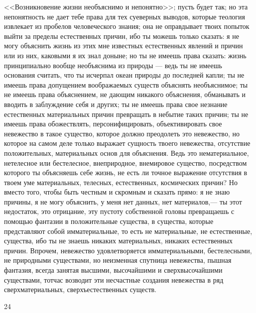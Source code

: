 \documentclass[12pt]{article}
\begin{document}
<<Возникновение жизни необъяснимо и непонятно>>; пусть будет так; но эта непонятность не дает тебе права для тех суеверных выводов, которые теология извлекает из пробелов человеческого знания; она не оправдывает твоих попыток выйти за пределы естественных причин, ибо ты можешь только сказать: я не могу объяснить жизнь из этих мне известных естественных явлений и причин или из них, каковыми я их знал доныне; но ты не имеешь права сказать: жизнь принципиально вообще необъяснима из природы --- ведь ты не имеешь основания считать, что ты исчерпал океан природы до последней капли; ты не имеешь права допущением воображаемых существ объяснять необъяснимое; ты не имеешь права объяснением, не дающим никакого объяснения, обманывать и вводить в заблуждение себя и других; ты не имеешь права свое незнание естественных материальных причин превращать в небытие таких причин; ты не имеешь права обожествлять, персонифицировать, объективировать свое невежество в такое существо, которое должно преодолеть это невежество, но которое на самом деле только выражает сущность твоего невежества, отсутствие положительных, материальных основ для объяснения. Ведь это нематериальное, нетелесное или бестелесное, внеприродное, внемировое существо, посредством которого ты объясняешь себе жизнь, не есть ли точное выражение отсутствия в твоем уме материальных, телесных, естественных, космических причин? Но вместо того, чтобы быть честным и скромным и сказать прямо: я не знаю причины, я не могу объяснить, у меня нет данных, нет материалов,--- ты этот недостаток, это отрицание, эту пустоту собственной головы превращаешь с помощью фантазии в положительные существа, в существа, которые представляют собой имматериальные, то есть не материальные, не естественные, существа, ибо ты не знаешь никаких материальных, никаких естественных причин. Впрочем, невежество удовлетворяется имматериальными, бестелесными, не природными существами, но неизменная спутница невежества, пышная фантазия, всегда занятая высшими, высочайшими и сверхвысочайшими существами, тотчас возводит эти несчастные создания невежества в ряд сверхматериальных, сверхъестественных существ.



24
\end{document}
